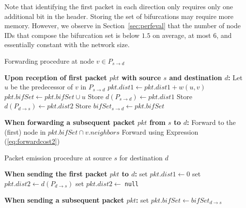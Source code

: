 \documentclass[conference]{IEEEtran}
\begin{document}
Note that identifying the first packet in each direction only requires only one additional bit in the header. Storing the set of bifurcations may require more memory. However, we observe in Section~\ref{sec:perfeval} that the number of node IDs that compose the bifurcation set is below $1.5$ on average, at most $6$, and essentially constant with the network size.



\begin{algorithm}[t]
\caption{Forwarding procedure at node $v \in P_{s \rightarrow d}$}
\begin{algorithmic}
\begin{small}
	\State \textbf{Upon reception of first packet $pkt$ with source $s$ and destination $d$:}
	\State Let $u$ be the predecessor of $v$ in $P_{s \rightarrow d}$
\State $pkt.dist1 \leftarrow pkt.dist1 + w(u,v)$
		\State $pkt.bifSet \leftarrow pkt.bifSet \cup u$
	\EndIf
		\State Store $d(P_{s \rightarrow d}) \leftarrow pkt.dist1$
			\State Store $d(P_{d \rightarrow s}) \leftarrow pkt.dist2$
		\EndIf
		\State Store $bifSet_{s \rightarrow d} \leftarrow pkt.bifSet$
	\EndIf
	
	\vspace{0.06in}
	
	\State \textbf{When forwarding a subsequent packet $pkt$ from $s$ to $d$:}
		\State Forward to the (first) node in $pkt.bifSet \cap v.neighbors$
	\Else
		\State Forward using Expression (\ref{eq:forwardcost2})
	\EndIf
\end{small}
\end{algorithmic}
\label{alg:fwdProcedure}
\end{algorithm}

\begin{algorithm}[t]
\caption{Packet emission procedure at source $s$ for destination $d$}
\begin{algorithmic}
\begin{small}
	\State \textbf{When sending the first packet $pkt$ to $d$:}
	\State set $pkt.dist1 \leftarrow 0$
		\State set $pkt.dist2 \leftarrow d(P_{d \rightarrow s})$
	\Else
		\State set $pkt.dist2 \leftarrow\;$\texttt{null}
	\EndIf
	
	\vspace{0.06in}
	
	\State \textbf{When sending a subsequent packet $pkt$:}
		\State set $pkt.bifSet \leftarrow bifSet_{d \rightarrow s}$
	\EndIf
	
\end{small}
\end{algorithmic}
\label{alg:sendProcedure}
\end{algorithm}
\end{document}

